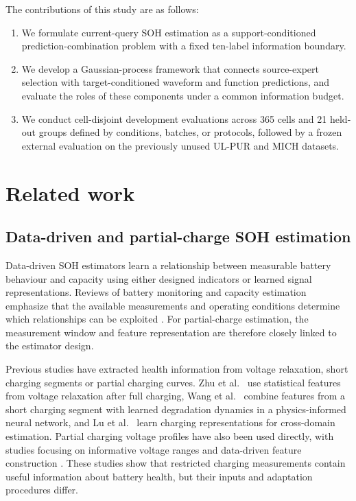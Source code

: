 \documentclass[preprint,12pt]{elsarticle}
\begin{document}
The contributions of this study are as follows:
\begin{enumerate}
\item We formulate current-query SOH estimation as a support-conditioned prediction-combination problem with a fixed ten-label information boundary.
\item We develop a Gaussian-process framework that connects source-expert selection with target-conditioned waveform and function predictions, and evaluate the roles of these components under a common information budget.
\item We conduct cell-disjoint development evaluations across 365 cells and 21 held-out groups defined by conditions, batches, or protocols, followed by a frozen external evaluation on the previously unused UL-PUR and MICH datasets.
\end{enumerate}

\section{Related work}
\label{sec:related}
\subsection{Data-driven and partial-charge SOH estimation}
Data-driven SOH estimators learn a relationship between measurable battery behaviour and capacity using either designed indicators or learned signal representations. Reviews of battery monitoring and capacity estimation emphasize that the available measurements and operating conditions determine which relationships can be exploited \citep{berecibar2016,waag2014,farmann2015}. For partial-charge estimation, the measurement window and feature representation are therefore closely linked to the estimator design.

Previous studies have extracted health information from voltage relaxation, short charging segments or partial charging curves. Zhu et al.\ \citep{zhu2022} use statistical features from voltage relaxation after full charging, Wang et al.\ \citep{wang2024} combine features from a short charging segment with learned degradation dynamics in a physics-informed neural network, and Lu et al.\ \citep{lu2023} learn charging representations for cross-domain estimation. Partial charging voltage profiles have also been used directly, with studies focusing on informative voltage ranges and data-driven feature construction \citep{stroe2018,meng2019,tang2024}. These studies show that restricted charging measurements contain useful information about battery health, but their inputs and adaptation procedures differ.
\end{document}
